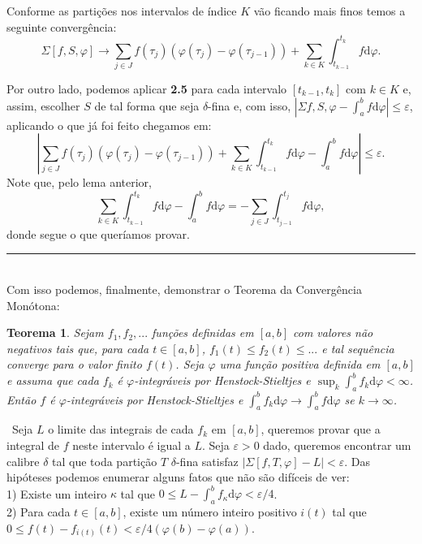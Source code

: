 \documentclass[12pt, a4paper]{article}
\newtheorem{thrm}[mydef]{Teorema}
\def\dem{\par\smallbreak\noindent {\textit{ Demonstração:}} \ }
\def\eop{\hfill\rule{2.5mm}{2.5mm}}
\theoremstyle{definition}
\begin{document}
Conforme as partições nos intervalos de índice $K$ vão ficando mais finos temos a seguinte convergência: $$\Sigma[f,S,\varphi]\rightarrow \sum_{j\in J}f(\tau_j)(\varphi(\tau_j)-\varphi(\tau_{j-1}))+\sum_{k\in K}\int_{t_{k-1}}^{t_k}f  \text{d}\varphi .$$

Por outro lado, podemos aplicar \textbf{2.5} para cada intervalo  $[t_{k-1},t_k]$ com $k\in K$ e, assim, escolher $S$ de tal forma que seja $\delta$-fina e, com isso, $|\Sigma {f,S,\varphi}-\int_a^b f  \text{d}\varphi|\leq \varepsilon$, aplicando o que já foi feito chegamos em: $$\left| \sum_{j\in J}f(\tau_j)(\varphi(\tau_j)-\varphi(\tau_{j-1}))+\sum_{k\in K}\int_{t_{k-1}}^{t_k}f  \text{d}\varphi-\int_a^b f  \text{d}\varphi\right|\leq \varepsilon .$$ Note que, pelo lema anterior, $$\sum_{k\in K}\int_{t_{k-1}}^{t_k}f  \text{d}\varphi-\int_a^b f  \text{d}\varphi= -\sum_{j\in J}\int_{t_{j-1}}^{t_j} f  \text{d}\varphi ,$$ donde segue o que queríamos provar. \eop \\ 

Com isso podemos, finalmente, demonstrar o Teorema da Convergência Monótona:

\begin{thrm}
	
	Sejam $f_1,f_2,...$ funções definidas em $[a,b]$ com valores não negativos tais que, para cada $t\in [a,b]$, $f_1(t)\leq f_2(t)\leq ...$ e tal sequência converge para o valor finito $f(t)$. Seja $\varphi$ uma função positiva definida em $[a,b]$ e assuma que cada $f_k$ é $\varphi$-integráveis por Henstock-Stieltjes e $\sup_k \int_a^b f_k  \text{d}\varphi < \infty$. Então $f$ é $\varphi$-integráveis por Henstock-Stieltjes e $ \int_a^b f_k  \text{d}\varphi \rightarrow  \int_a^b f  \text{d}\varphi$ se $k\rightarrow \infty$.
	
\end{thrm}

\dem Seja $L$ o limite das integrais de cada $f_k$ em $[a,b]$, queremos provar que a integral de $f$ neste intervalo é igual a $L$. Seja $\varepsilon >0$ dado, queremos encontrar um calibre $\delta$ tal que toda partição $T$ $\delta$-fina satisfaz $|\Sigma[f,T,\varphi]-L|<\varepsilon$. Das hipóteses podemos enumerar alguns fatos que não são difíceis de ver: \\

1) Existe um inteiro $\kappa$ tal que $0\leq L-\int_a^b f_\kappa  \text{d}\varphi <\varepsilon /4$. \\

2) Para cada $t\in[a,b]$, existe um número inteiro positivo $i(t)$ tal que $0\leq f(t)-f_{i(t)}(t)< \varepsilon / 4(\varphi(b)-\varphi(a))$.  \\
\end{document}
